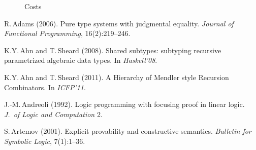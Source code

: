 \documentclass[11pt,twocolumn]{article}
\begin{document}
\begin{figure*}[t]
\caption{Costs}
\hspace*{30mm}
\vspace*{15cm}
\end{figure*}

{\footnotesize
\begin{thebibliography}{000}


R.\,Adams (2006).
\newblock Pure type systems with judgmental equality.
\newblock \emph{Journal of Functional Programming}, 16(2):219--246.

K.Y.\,Ahn and T.\,Sheard (2008).
\newblock Shared subtypes: subtyping recursive parametrized algebraic data
types.  
\newblock In \emph{Haskell'08}.  

K.Y.\,Ahn and T.\,Sheard (2011).
\newblock A Hierarchy of Mendler style Recursion Combinators. 
\newblock In \emph{ICFP'11}.  




J.-M.\,Andreoli (1992).
\newblock Logic programming with focusing proof in linear logic.
\newblock \emph{J.\ of Logic and Computation} 2.

S.\,Artemov (2001).
\newblock Explicit provability and constructive semantics.
\newblock \emph{Bulletin for Symbolic Logic}, 7(1):1--36.



\end{thebibliography}}
\end{document}
